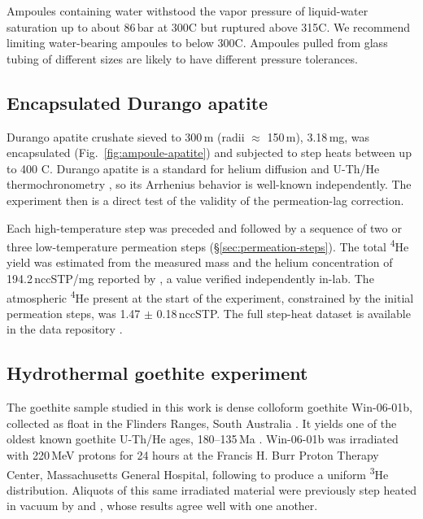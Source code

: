 Ampoules containing water withstood the vapor pressure of liquid-water saturation up to about 86\,bar at 300\textdegree C \citep{haar1984} but ruptured above 315\textdegree C. We recommend limiting water-bearing ampoules to below 300\textdegree C. Ampoules pulled from glass tubing of different sizes are likely to have different pressure tolerances. 

\subsection{Encapsulated Durango apatite}\label{sec:methods-apatite}

Durango apatite crushate sieved to 300\,\textmu m (radii $\approx$ 150\,\textmu m), 3.18\,mg, was encapsulated (Fig.~\ref{fig:ampoule-apatite}) and subjected to step heats between up to 400 \textdegree C. Durango apatite is a standard for helium diffusion and U-Th/He thermochronometry \citep{zeitler1987,wolf1996,farley2000,shusterfarley2004,shuster2006,flowers2007}, so its Arrhenius behavior is well-known independently. The experiment then is a direct test of the validity of the permeation-lag correction.

Each high-temperature step was preceded and followed by a sequence of two or three low-temperature permeation steps (\S\ref{sec:permeation-steps}). The total \textsuperscript{4}He yield was estimated from the measured mass and the helium concentration of 194.2\,nccSTP/mg reported by \citet{farley2000}, a value verified independently in-lab. The atmospheric \textsuperscript{4}He present at the start of the experiment, constrained by the initial permeation steps, was 1.47 $\pm$ 0.18\,nccSTP. The full step-heat dataset is available in the data repository \citep{thyer_2026}.

\subsection{Hydrothermal goethite experiment}\label{sec:methods-goethite}

The goethite sample studied in this work is dense colloform goethite Win-06-01b, collected as float in the Flinders Ranges, South Australia \citep{waltenberg2012,monteiro2017}. It yields one of the oldest known goethite U-Th/He ages, 180--135\,Ma \citep{waltenberg2012}. Win-06-01b was irradiated with 220\,MeV protons for 24 hours at the Francis H. Burr Proton Therapy Center, Massachusetts General Hospital, following \citet{shuster2004} to produce a uniform \textsuperscript{3}He distribution. Aliquots of this same irradiated material were previously step heated in vacuum by \citet{monteiro2017} and \citet{farley2024}, whose results agree well with one another. 

